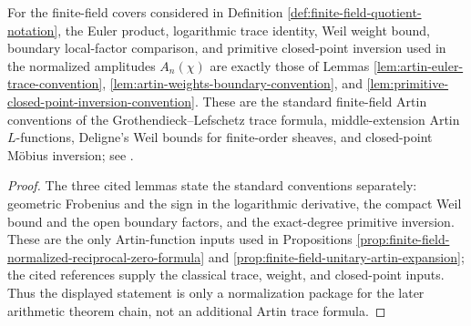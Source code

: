 \begin{lemma}\label{prop:classical-artin-conventions}
For the finite-field covers considered in Definition
\ref{def:finite-field-quotient-notation}, the Euler product, logarithmic trace
identity, Weil weight bound, boundary local-factor comparison, and primitive
closed-point inversion used in the normalized amplitudes \(A_n(\chi)\) are
exactly those of Lemmas \ref{lem:artin-euler-trace-convention},
\ref{lem:artin-weights-boundary-convention}, and
\ref{lem:primitive-closed-point-inversion-convention}. These are the standard
finite-field Artin conventions of the Grothendieck--Lefschetz trace formula,
middle-extension Artin \(L\)-functions, Deligne's Weil bounds for finite-order
sheaves, and closed-point M\"obius inversion; see
\cite{DeligneSGA4half1977,Deligne1980WeilII,Milne1980Etale,Serre1981,Rosen2002}.
\end{lemma}

\begin{proof}
The three cited lemmas state the standard conventions separately: geometric Frobenius
and the sign in the logarithmic derivative, the compact Weil bound and the
open boundary factors, and the exact-degree primitive inversion.  These are
the only Artin-function inputs used in Propositions
\ref{prop:finite-field-normalized-reciprocal-zero-formula} and
\ref{prop:finite-field-unitary-artin-expansion}; the cited references supply
the classical trace, weight, and closed-point inputs. Thus the displayed
statement is only a normalization package for the later arithmetic theorem
chain, not an additional Artin trace formula.
\end{proof}

